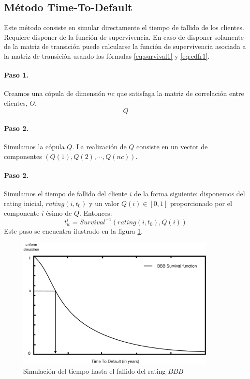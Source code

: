 \subsection{M\'etodo Time-To-Default}
\label{res:mttd}

Este m\'etodo consiste en simular directamente el tiempo de fallido de los
clientes. Requiere disponer de la funci\'on de supervivencia. En caso
de disponer solamente de la matriz de transici\'on puede calcularse la funci\'on
de supervivencia asociada a la matriz de transici\'on usando las f\'ormulas
\ref{eq:survival1} y \ref{eq:cdfr1}.

\paragraph{Paso 1.} Creamos una c\'opula de dimensi\'on $nc$ que satisfaga la
matriz de correlaci\'on entre clientes, $\Theta$.
\begin{displaymath}
Q
\end{displaymath}

\paragraph{Paso 2.} Simulamos la c\'opula $Q$. La realizaci\'on de $Q$ consiste
en un vector de componentes $(Q(1), Q(2), \cdots, Q(nc))$.

\paragraph{Paso 2.} Simulamos el tiempo de fallido del cliente $i$ de la forma siguiente:
disponemos del rating inicial, $rating(i,t_0)$ y un valor $Q(i) \in [0,1]$ proporcionado
por el componente $i$-\'esimo de $Q$. Entonces:
\begin{displaymath}
t_w^i = Survival^{-1}(rating(i,t_0),Q(i))
\end{displaymath}
Este paso se encuentra ilustrado en la figura \ref{simttd}.

\begin{figure}[!hb]
\begin{center}
\includegraphics[width=10cm,angle=0]{./images/simttd.eps}
\caption{Simulaci\'on del tiempo hasta el fallido del rating $BBB$}
\label{simttd}
\end{center}
\end{figure}

